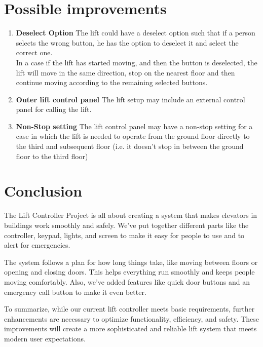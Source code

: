 \documentclass{article}
\begin{document}
\clearpage
\section{Possible improvements}
\begin{enumerate}
    \item \textbf{Deselect Option} The lift could have a deselect option such that if a person selects the wrong button, he has the option to deselect it and select the correct one.\\ In a case if the lift has started moving, and then the button is deselected, the lift will move in the same direction, stop on the nearest floor and then continue moving according to the remaining selected buttons.
    \item \textbf{Outer lift control panel} The lift setup may include an external control panel for calling the lift.
    \item \textbf{Non-Stop setting} The lift control panel may have a non-stop setting for a case in which the lift is needed to operate from the ground floor directly to the third and subsequent floor (i.e. it doesn't stop in between the ground floor to the third floor)
\end{enumerate}
\section{Conclusion}
The Lift Controller Project is all about creating a system that makes elevators in buildings work smoothly and safely. We've put together different parts like the controller, keypad, lights, and screen to make it easy for people to use and to alert for emergencies. 

The system follows a plan for how long things take, like moving between floors or opening and closing doors. This helps everything run smoothly and keeps people moving comfortably. Also, we've added features like quick door buttons and an emergency call button to make it even better.

To summarize, while our current lift controller meets basic requirements, further enhancements are necessary to optimize functionality, efficiency, and safety. These improvements will create a more sophisticated and reliable lift system that meets modern user expectations.


\clearpage
\end{document}

